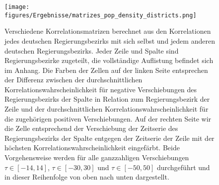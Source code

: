 \begin{figure}[H]
    \centering
    \texttt{[image: figures/Ergebnisse/matrizes\_pop\_density\_districts.png]}
    \caption{Verschiedene Korrelationsmatrizen berechnet aus den Korrelationen jedes deutschen Regierungsbezirks mit sich selbst und jedem anderen deutschen Regierungsbezirks. Jeder Zeile und Spalte sind Regierungsbezirke zugeteilt, die vollständige Auflistung befindet sich im Anhang. Die Farben der Zellen auf der linken Seite entsprechen der Differenz zwischen der durchschnittlichen Korrelationswahrscheinlichkeit für negative Verschiebungen des Regierungsbezirks der Spalte in Relation zum Regierungsbezirk der Zeile und der durchschnittlichen Korrelationswahrscheinlichkeit für die zugehörigen positiven Verschiebungen.
    Auf der rechten Seite wir die Zelle entsprechend der Verschiebung der Zeitserie des Regierungsbezirks der Spalte entgegen der Zeitserie der Zeile mit der höchsten Korrelationswahrscheinlichkeit eingefärbt. Beide Vorgehensweise werden für alle ganzzahligen Verschiebungen $\tau\in[-14,14]$,  $\tau\in[-30,30]$ und  $\tau\in[-50,50]$ durchgeführt und in dieser Reihenfolge von oben nach unten dargestellt.}
    \label{fig:matrizes_pop_density_districts}
\end{figure}

